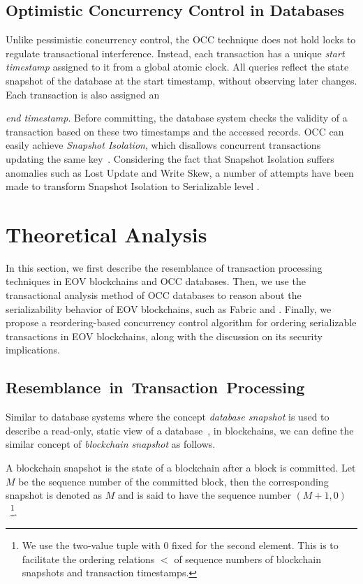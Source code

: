 \subsection{Optimistic Concurrency Control in Databases}
Unlike pessimistic concurrency control, the OCC technique does not hold locks to
regulate transactional interference.
%
Instead, each transaction has a unique \textit{start timestamp} assigned to it
from a global atomic clock.
%
All queries reflect the state snapshot of the database at the start timestamp,
without observing later changes.
%
Each transaction is also assigned an {\textit{end timestamp}. 
%
Before committing, the database system checks the validity of a transaction
based on these two timestamps and the accessed records.
%
OCC can easily achieve \textit{Snapshot Isolation}, which disallows concurrent
transactions updating the same key~\cite{berenson1995critique}.
%
Considering the fact that Snapshot Isolation suffers anomalies such as
Lost Update and Write Skew, a number of attempts have been
made to transform Snapshot Isolation to Serializable level
\cite{fekete2005making, yabandeh2012critique, bornea2011one}.

\section{Theoretical Analysis}
\label{sec:txn:theory}

In this section, we first describe the resemblance of transaction processing
techniques in EOV blockchains and OCC databases.
%
Then, we use the transactional analysis method of OCC databases to
reason about the serializability behavior of EOV blockchains, such as Fabric and {\fabricPlusplus}.
%
Finally, we propose a reordering-based concurrency control algorithm for ordering
serializable transactions in EOV blockchains, 
along with the discussion on its security implications.

\subsection{Resemblance~in~Transaction~Processing}
\label{sec:txn:resembalance}
%
Similar to database systems where the concept \textit{database snapshot} is used
to describe a read-only, static view of a database~\cite{kung1981optimistic}, in blockchains, we can define the similar concept of \textit{blockchain snapshot} as follows.

\begin{definition}
  \label{defn:snapshot}
  A blockchain snapshot is the state of a blockchain after a block is committed.
  Let $M$ be the sequence number of the committed block, then the
  corresponding snapshot is denoted as $M$ and is said to have the sequence
  number $(M{+}1,0)$~\footnote{We use the two-value tuple with 0 fixed for the
    second element. This is to facilitate the ordering relations $<$ of sequence numbers of blockchain snapshots and
    transaction timestamps.}.
\end{definition}

}
